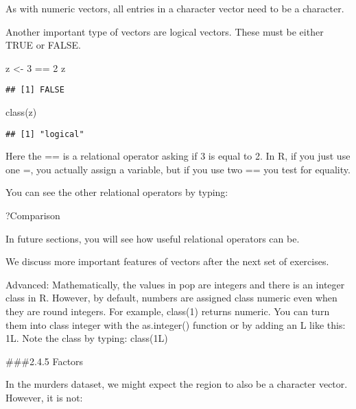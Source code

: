 \documentclass[
]{article}
\newenvironment{Shaded}{\begin{snugshade}}{\end{snugshade}}
\newcommand{\DecValTok}[1]{\textcolor[rgb]{0.00,0.00,0.81}{#1}}
\newcommand{\FunctionTok}[1]{\textcolor[rgb]{0.00,0.00,0.00}{#1}}
\newcommand{\NormalTok}[1]{#1}
\newcommand{\OtherTok}[1]{\textcolor[rgb]{0.56,0.35,0.01}{#1}}
\newcommand{\SpecialCharTok}[1]{\textcolor[rgb]{0.00,0.00,0.00}{#1}}
\begin{document}
As with numeric vectors, all entries in a character vector need to be a
character.

Another important type of vectors are logical vectors. These must be
either TRUE or FALSE.

\begin{Shaded}
\begin{Highlighting}[]
\NormalTok{z }\OtherTok{\textless{}{-}} \DecValTok{3} \SpecialCharTok{==} \DecValTok{2}
\NormalTok{z}
\end{Highlighting}
\end{Shaded}

\begin{verbatim}
## [1] FALSE
\end{verbatim}

\begin{Shaded}
\begin{Highlighting}[]
\FunctionTok{class}\NormalTok{(z)}
\end{Highlighting}
\end{Shaded}

\begin{verbatim}
## [1] "logical"
\end{verbatim}

Here the == is a relational operator asking if 3 is equal to 2. In R, if
you just use one =, you actually assign a variable, but if you use two
== you test for equality.

You can see the other relational operators by typing:

\begin{Shaded}
\begin{Highlighting}[]
\NormalTok{?Comparison}
\end{Highlighting}
\end{Shaded}

In future sections, you will see how useful relational operators can be.

We discuss more important features of vectors after the next set of
exercises.

Advanced: Mathematically, the values in pop are integers and there is an
integer class in R. However, by default, numbers are assigned class
numeric even when they are round integers. For example, class(1) returns
numeric. You can turn them into class integer with the as.integer()
function or by adding an L like this: 1L. Note the class by typing:
class(1L)

\#\#\#2.4.5 Factors

In the murders dataset, we might expect the region to also be a
character vector. However, it is not:
\end{document}
